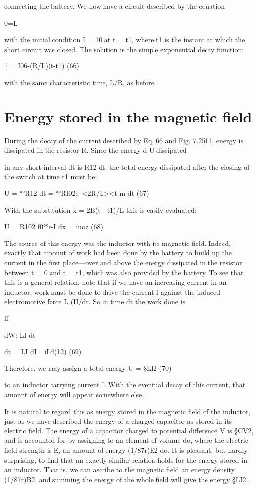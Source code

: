 connecting the battery. We now have a circuit described by the
equation

0=L%

with the initial condition I = 10 at t = t1, where t1 is the instant at
which the short circuit was closed. The solution is the simple exponential
decay function:

1 = I06-(R/L)(t-t1) (66)

with the same characteristic time, L/R, as before.

\section{Energy stored in the magnetic field}
During the decay of the current described by Eq. 66 and Fig. 7.2511,
energy is dissipated in the resistor R. Since the energy d U dissipated

in any short interval dt is R12 dt, the total energy dissipated after
the closing of the switch at time t1 must be:

U = °°R12 dt = °°RI02e~<2R/L><t-m dt (67)

With the substitution x = 2B(t - t1)/L this is easily evaluated:

U = R102 f0°°e-I dx = iuoz (68)

The source of this energy was the inductor with its magnetic field.
Indeed, exactly that amount of work had been done by the battery
to build up the current in the first place---over and above the energy
dissipated in the resistor between t = 0 and t = t1, which was also
provided by the battery. To see that this is a general relation, note
that if we have an increasing current in an inductor, work must be
done to drive the current I against the induced electromotive force
L (II/dt. So in time dt the work done is

ff

dW: LI dt

dt = LI dI =iLd(12) (69)

Therefore, we may assign a total energy
U = §LI2 (70)

to an inductor carrying current I. With the eventual decay of this
current, that amount of energy will appear somewhere else.

It is natural to regard this as energy stored in the magnetic field
of the inductor, just as we have described the energy of a charged
capacitor as stored in its electric field. The energy of a capacitor
charged to potential difference V is §CV2, and is accounted for by
assigning to an element of volume do, where the electric field strength
is E, an amount of energy (1/87r)E2 do. It is pleasant, but hardly
surprising, to find that an exactly similar relation holds for the energy
stored in an inductor. That is, we can ascribe to the magnetic field
an energy density (1/87r)B2, and summing the energy of the whole
field will give the energy §LI2.

